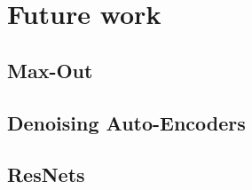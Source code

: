\chapter {Future work}
\label{chap:futurework}

	\section{Max-Out}
	\section{Denoising Auto-Encoders}
	\section{ResNets}